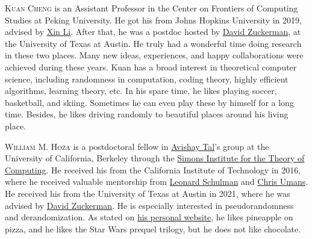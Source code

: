 \documentclass{toc}
\begin{document}
%
%
%
%
%
%
%
%
%
%
%
%
%
%
%
%
%
%
%
%
\begin{tocaboutauthors}
\begin{tocabout}[cheng]
\textsc{Kuan Cheng} is an Assistant Professor in the Center on Frontiers of Computing Studies at Peking University. He got his {\phd} from Johns Hopkins University in 2019, advised by \href{https://www.cs.jhu.edu/~lixints/}{Xin Li}. After that, he was a postdoc hosted by \href{https://www.cs.utexas.edu/~diz/index.html}{David Zuckerman}, at the University of Texas at Austin.  He truly had a wonderful time doing research in these two places. Many new ideas, experiences, and happy collaborations were achieved during these years. Kuan has a broad interest in theoretical computer science, including randomness in computation, coding theory, highly efficient algorithms, learning theory, etc. In his spare time, he likes playing soccer, basketball, and skiing. Sometimes he can even play these by himself for a long time. Besides, he likes driving randomly to beautiful places around his living place.
\end{tocabout}
\begin{tocabout}[hoza]
\textsc{William M. Hoza} is a postdoctoral fellow in \href{https://www.avishaytal.org/}{Avishay Tal}'s group at the University of California, Berkeley through the \href{https://simons.berkeley.edu/}{Simons Institute for the Theory of Computing}. He received his {\bsc} from the California Institute of Technology in 2016, where he received valuable mentorship from \href{http://users.cms.caltech.edu/~schulman/}{Leonard Schulman} and \href{http://users.cms.caltech.edu/~umans/}{Chris Umans}. He received his {\phd} from the University of Texas at Austin in 2021, where he was advised by \href{https://www.cs.utexas.edu/~diz/}{David Zuckerman}. He is especially interested in pseudorandomness and derandomization. As stated on \href{https://williamhoza.com/personal/}{his personal website}, he likes pineapple on pizza, and he likes the Star Wars prequel trilogy, but he does not like chocolate.
\end{tocabout}
\end{tocaboutauthors}
\end{document}

